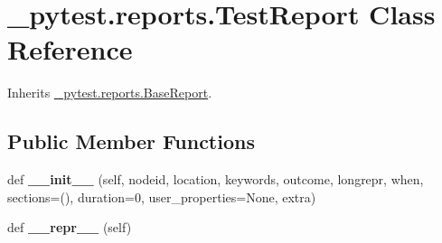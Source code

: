 \hypertarget{class__pytest_1_1reports_1_1_test_report}{}\section{\+\_\+pytest.\+reports.\+Test\+Report Class Reference}
\label{class__pytest_1_1reports_1_1_test_report}


Inherits \hyperlink{class__pytest_1_1reports_1_1_base_report}{\+\_\+pytest.\+reports.\+Base\+Report}.

\subsection*{Public Member Functions}
\begin{DoxyCompactItemize}
\item 
\mbox{\label{class__pytest_1_1reports_1_1_test_report_a61ecb5113f97dbf718e0de99f169b68c}} 
def {\bfseries \+\_\+\+\_\+init\+\_\+\+\_\+} (self, nodeid, location, keywords, outcome, longrepr, when, sections=(), duration=0, user\+\_\+properties=None, extra)
\item 
\mbox{\label{class__pytest_1_1reports_1_1_test_report_a45184bea16a1d631795da712dfd4d3ed}} 
def {\bfseries \+\_\+\+\_\+repr\+\_\+\+\_\+} (self)
\end{DoxyCompactItemize}
